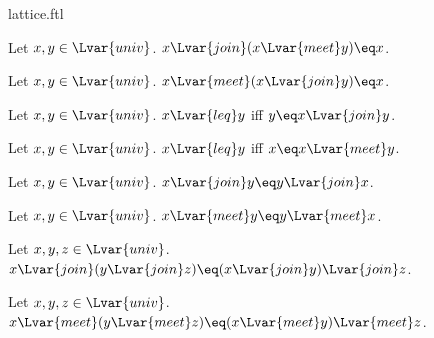 \documentclass{naproche-library}
\begin{document}
\begin{smodule}{lattice.ftl}
\begin{proposition*}[forthel,id=JoinAbsorbsMeetThm]
  Let $x,y\in\Lvar{univ}$.
  $x{\Lvar{join}}(x{\Lvar{meet}}y)\eq x$.
\end{proposition*}

\begin{proposition*}[forthel,id=MeetAbsorbsJoinThm]
  Let $x,y\in\Lvar{univ}$.
  $x{\Lvar{meet}}(x{\Lvar{join}}y)\eq x$.
\end{proposition*}

\begin{proposition*}[forthel,id=PrecedingIffJoinEqualsLargerOperandThm]
  Let $x,y\in\Lvar{univ}$.
  $x{\Lvar{leq}}y$ iff $y\eq x{\Lvar{join}}y$.
\end{proposition*}

\begin{proposition*}[forthel,id=PrecedingIffMeetEqualsLargerOperandThm]
  Let $x,y\in\Lvar{univ}$.
  $x{\Lvar{leq}}y$ iff $x\eq x{\Lvar{meet}}y$.
\end{proposition*}

\begin{proposition*}[forthel,id=JoinIsCommutativeThm]
  Let $x,y\in\Lvar{univ}$.
  $x{\Lvar{join}}y\eq y{\Lvar{join}}x$.
\end{proposition*}

\begin{proposition*}[forthel,id=MeetIsCommutativeThm]
  Let $x,y\in\Lvar{univ}$.
  $x{\Lvar{meet}}y\eq y{\Lvar{meet}}x$.
\end{proposition*}

\begin{proposition*}[forthel,id=JoinIsAssociativeThm]
  Let $x,y,z\in\Lvar{univ}$.
  $x{\Lvar{join}}(y{\Lvar{join}}z)\eq (x{\Lvar{join}}y){\Lvar{join}}z$.
\end{proposition*}

\begin{proposition*}[forthel,id=MeetIsAssociativeThm]
  Let $x,y,z\in\Lvar{univ}$.
  $x{\Lvar{meet}}(y{\Lvar{meet}}z)\eq (x{\Lvar{meet}}y){\Lvar{meet}}z$.
\end{proposition*}
\end{smodule}
\end{document}
